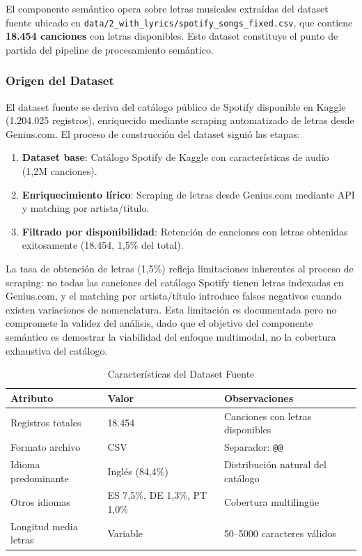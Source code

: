 El componente semántico opera sobre letras musicales extraídas del dataset fuente ubicado en \texttt{data/2\_with\_lyrics/spotify\_songs\_fixed.csv}, que contiene \textbf{18.454 canciones} con letras disponibles. Este dataset constituye el punto de partida del pipeline de procesamiento semántico.

\subsubsection{Origen del Dataset}

El dataset fuente se deriva del catálogo público de Spotify disponible en Kaggle (1.204.025 registros), enriquecido mediante scraping automatizado de letras desde Genius.com. El proceso de construcción del dataset siguió las etapas:

\begin{enumerate}
    \item \textbf{Dataset base}: Catálogo Spotify de Kaggle con características de audio (1,2M canciones).
    \item \textbf{Enriquecimiento lírico}: Scraping de letras desde Genius.com mediante API y matching por artista/título.
    \item \textbf{Filtrado por disponibilidad}: Retención de canciones con letras obtenidas exitosamente (18.454, 1,5\% del total).
\end{enumerate}

La tasa de obtención de letras (1,5\%) refleja limitaciones inherentes al proceso de scraping: no todas las canciones del catálogo Spotify tienen letras indexadas en Genius.com, y el matching por artista/título introduce falsos negativos cuando existen variaciones de nomenclatura. Esta limitación es documentada pero no compromete la validez del análisis, dado que el objetivo del componente semántico es demostrar la viabilidad del enfoque multimodal, no la cobertura exhaustiva del catálogo.

\begin{table}[htbp]
\centering
\caption{Características del Dataset Fuente}
\label{tab:dataset-fuente}
\begin{tabular}{lll}
\toprule
\textbf{Atributo} & \textbf{Valor} & \textbf{Observaciones} \\
\midrule
Registros totales & 18.454 & Canciones con letras disponibles \\
Formato archivo & CSV & Separador: \texttt{@@} \\
Idioma predominante & Inglés (84,4\%) & Distribución natural del catálogo \\
Otros idiomas & ES 7,5\%, DE 1,3\%, PT 1,0\% & Cobertura multilingüe \\
Longitud media letras & Variable & 50--5000 caracteres válidos \\
\bottomrule
\end{tabular}
\end{table}

